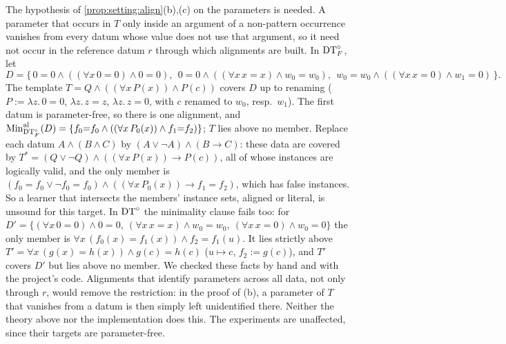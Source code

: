 \begin{remark}\label{rem:setting:alignfail}
The hypothesis of \cref{prop:setting:align}(b),(c) on the parameters is needed. A parameter that occurs in $T$ only inside an argument of a non-pattern occurrence vanishes from every datum whose value does not use that argument, so it need not occur in the reference datum $r$ through which alignments are built. In $\mathrm{DT}^{\circ}_{F}$, let
\[D=\bigl\{\,0{=}0\wedge((\forall x\,0{=}0)\wedge0{=}0),\ \ 0{=}0\wedge((\forall x\,x{=}x)\wedge w_0{=}w_0),\ \ w_0{=}w_0\wedge((\forall x\,x{=}0)\wedge w_1{=}0)\,\bigr\}.\]
The template $T=Q\wedge((\forall x\,P(x))\wedge P(c))$ covers $D$ up to renaming ($P:=\lambda z.\,0{=}0$, $\lambda z.\,z{=}z$, $\lambda z.\,z{=}0$, with $c$ renamed to $w_0$, resp.\ $w_1$). The first datum is parameter-free, so there is one alignment, and $\mathrm{Min}^{\mathrm{al}}_{\mathrm{DT}^{\circ}_{F}}(D)=\{f_0{=}f_0\wedge((\forall x\,P_0(x))\wedge f_1{=}f_2)\}$; $T$ lies above no member. Replace each datum $A\wedge(B\wedge C)$ by $(A\vee\neg A)\wedge(B\to C)$: these data are covered by $T^*=(Q\vee\neg Q)\wedge((\forall x\,P(x))\to P(c))$, all of whose instances are logically valid, and the only member is $(f_0{=}f_0\vee\neg f_0{=}f_0)\wedge((\forall x\,P_0(x))\to f_1{=}f_2)$, which has false instances. So a learner that intersects the members' instance sets, aligned or literal, is unsound for this target. In $\mathrm{DT}^{\circ}$ the minimality clause fails too: for $D'=\{(\forall x\,0{=}0)\wedge0{=}0,\ (\forall x\,x{=}x)\wedge w_0{=}w_0,\ (\forall x\,x{=}0)\wedge w_0{=}0\}$ the only member is $\forall x\,(f_0(x){=}f_1(x))\wedge f_2{=}f_1(u)$. It lies strictly above $T'=\forall x\,(g(x){=}h(x))\wedge g(c){=}h(c)$ ($u\mapsto c$, $f_2:=g(c)$), and $T'$ covers $D'$ but lies above no member. We checked these facts by hand and with the project's code. Alignments that identify parameters across all data, not only through $r$, would remove the restriction: in the proof of (b), a parameter of $T$ that vanishes from a datum is then simply left unidentified there. Neither the theory above nor the implementation does this. The experiments are unaffected, since their targets are parameter-free.
\end{remark}

